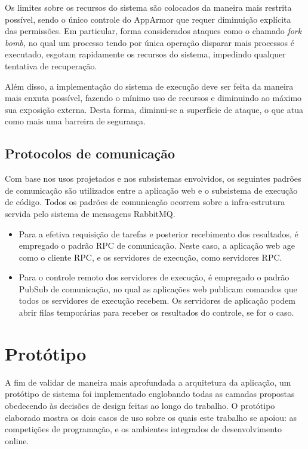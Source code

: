 \documentclass[ruledheader, 12pt]{abnt}
\begin{document}
Os limites sobre os recursos do sistema são colocados da maneira mais restrita possível, sendo o único controle do AppArmor que requer diminuição explícita das permissões. Em particular, forma considerados ataques como o chamado \emph{fork bomb,} no qual um processo tendo por única operação disparar mais processos é executado, esgotam rapidamente os recursos do sistema, impedindo qualquer tentativa de recuperação.

Além disso, a implementação do sistema de execução deve ser feita da maneira mais enxuta possível, fazendo o mínimo uso de recursos e diminuindo ao máximo sua exposição externa. Desta forma, diminui-se a superfície de ataque, o que atua como mais uma barreira de segurança.

\subsection{Protocolos de comunicação}

Com base nos usos projetados e nos subsistemas envolvidos, os seguintes padrões de comunicação são utilizados entre a aplicação web e o subsistema de execução de código. Todos os padrões de comunicação ocorrem sobre a infra-estrutura servida pelo sistema de mensagens RabbitMQ.
\begin{itemize}
	\item Para a efetiva requisição de tarefas e posterior recebimento dos resultados, é empregado o padrão RPC de comunicação. Neste caso, a aplicação web age como o cliente RPC, e os servidores de execução, como servidores RPC.
	
	\item Para o controle remoto dos servidores de execução, é empregado o padrão PubSub de comunicação, no qual as aplicações web publicam comandos que todos os servidores de execução recebem. Os servidores de aplicação podem abrir filas temporárias para receber os resultados do controle, se for o caso.
\end{itemize}

\section{Protótipo}

A fim de validar de maneira mais aprofundada a arquitetura da aplicação, um protótipo de sistema foi implementado englobando todas as camadas propostas obedecendo às decisões de design feitas ao longo do trabalho. O protótipo elaborado mostra os dois casos de uso sobre os quais este trabalho se apoiou: as competições de programação, e os ambientes integrados de desenvolvimento online.
\end{document}
